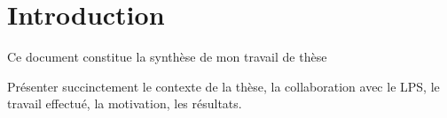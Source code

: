 
\chapter{Introduction}
\label{ch:introduction}

Ce document constitue la synthèse de mon travail de thèse 
    
    Présenter succinctement le contexte de la thèse, la collaboration avec le LPS, le travail effectué, la motivation, les résultats.


